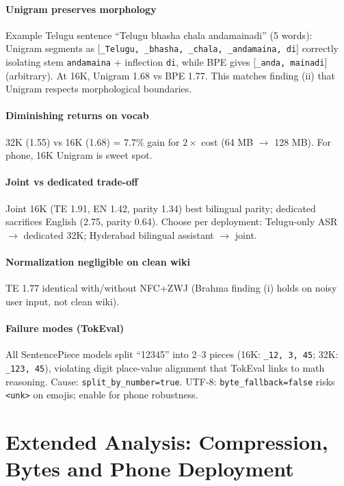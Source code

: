 \documentclass[conference]{IEEEtran}
\begin{document}
\paragraph{Unigram preserves morphology} Example Telugu sentence ``Telugu bhasha chala andamainadi'' (5 words): Unigram segments as $[$\texttt{\_Telugu, \_bhasha, \_chala, \_andamaina, di}$]$ correctly isolating stem \texttt{andamaina} + inflection \texttt{di}, while BPE gives $[$\texttt{\_anda, mainadi}$]$ (arbitrary). At 16K, Unigram 1.68 vs BPE 1.77. This matches \cite{brahma2026indic} finding (ii) that Unigram respects morphological boundaries.

\paragraph{Diminishing returns on vocab} 32K (1.55) vs 16K (1.68) = $7.7\%$ gain for $2\times$ cost (64 MB $\rightarrow$ 128 MB). For phone, 16K Unigram is sweet spot.

\paragraph{Joint vs dedicated trade-off} Joint 16K (TE 1.91, EN 1.42, parity 1.34) best bilingual parity; dedicated sacrifices English (2.75, parity 0.64). Choose per deployment: Telugu-only ASR $\rightarrow$ dedicated 32K; Hyderabad bilingual assistant $\rightarrow$ joint.

\paragraph{Normalization negligible on clean wiki} TE 1.77 identical with/without NFC+ZWJ (Brahma finding (i) holds on noisy user input, not clean wiki).

\paragraph{Failure modes (TokEval)} All SentencePiece models split ``12345'' into 2--3 pieces (16K: \texttt{\_12, 3, 45}; 32K: \texttt{\_123, 45}), violating digit place-value alignment that TokEval links to math reasoning. Cause: \texttt{split\_by\_number=true}. UTF-8: \texttt{byte\_fallback=false} risks \texttt{<unk>} on emojis; enable for phone robustness.

\section{Extended Analysis: Compression, Bytes and Phone Deployment}
\end{document}

